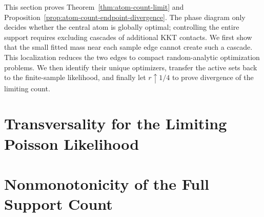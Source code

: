 \documentclass[11pt]{article}
\theoremstyle{definition}
\numberwithin{equation}{section}
\begin{document}
This section proves Theorem~\ref{thm:atom-count-limit} and
Proposition~\ref{prop:atom-count-endpoint-divergence}. The phase diagram only
decides whether the central atom is globally optimal; controlling the entire
support requires excluding cascades of additional KKT contacts. We first show
that the small fitted mass near each sample edge cannot create such a cascade.
This localization reduces the two edges to compact random-analytic
optimization problems. We then identify their unique optimizers, transfer the
active sets back to the finite-sample likelihood, and finally let
\(r\uparrow1/4\) to prove divergence of the limiting count.





\appendix

\section{Transversality for the Limiting Poisson Likelihood}
\label{app:poisson-transversality}



\section{Nonmonotonicity of the Full Support Count}
\label{app:full-support-nonmonotonicity}





\end{document}
